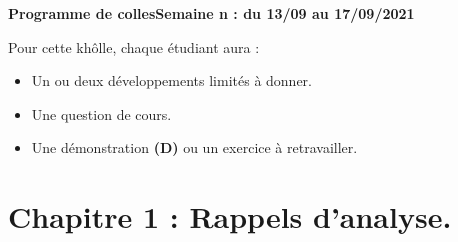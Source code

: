 \documentclass[twoside,a4paper,french,10pt]{VcCours}
\begin{document}

\begin{center}
\large\bf
Programme de collesSemaine n : du 13/09 au 17/09/2021
\end{center}
\separationTitre


Pour cette khôlle, chaque étudiant aura :
\begin{itemize}
\item Un ou deux développements limités à donner.
\item Une question de cours.
\item Une démonstration \textbf{(D)} ou un exercice à retravailler.
\end{itemize}


\medskip 

\section*{Chapitre 1 : Rappels d'analyse.}
\end{document}
